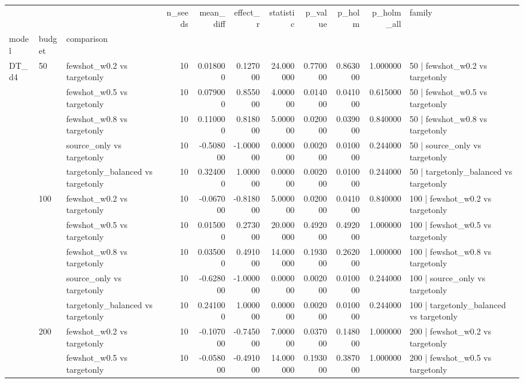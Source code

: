 \begin{tabular}{lllrrrrrrrl}
\toprule
 &  &  & n_seeds & mean_diff & effect_r & statistic & p_value & p_holm & p_holm_all & family \\
model & budget & comparison &  &  &  &  &  &  &  &  \\
\midrule
\multirow[t]{25}{*}{DT_d4} & \multirow[t]{5}{*}{50} & fewshot_w0.2 vs targetonly & 10 & 0.018000 & 0.127000 & 24.000000 & 0.770000 & 0.863000 & 1.000000 & 50 | fewshot_w0.2 vs targetonly \\
 &  & fewshot_w0.5 vs targetonly & 10 & 0.079000 & 0.855000 & 4.000000 & 0.014000 & 0.041000 & 0.615000 & 50 | fewshot_w0.5 vs targetonly \\
 &  & fewshot_w0.8 vs targetonly & 10 & 0.110000 & 0.818000 & 5.000000 & 0.020000 & 0.039000 & 0.840000 & 50 | fewshot_w0.8 vs targetonly \\
 &  & source_only vs targetonly & 10 & -0.508000 & -1.000000 & 0.000000 & 0.002000 & 0.010000 & 0.244000 & 50 | source_only vs targetonly \\
 &  & targetonly_balanced vs targetonly & 10 & 0.324000 & 1.000000 & 0.000000 & 0.002000 & 0.010000 & 0.244000 & 50 | targetonly_balanced vs targetonly \\
\cline{2-11}
 & \multirow[t]{5}{*}{100} & fewshot_w0.2 vs targetonly & 10 & -0.067000 & -0.818000 & 5.000000 & 0.020000 & 0.041000 & 0.840000 & 100 | fewshot_w0.2 vs targetonly \\
 &  & fewshot_w0.5 vs targetonly & 10 & 0.015000 & 0.273000 & 20.000000 & 0.492000 & 0.492000 & 1.000000 & 100 | fewshot_w0.5 vs targetonly \\
 &  & fewshot_w0.8 vs targetonly & 10 & 0.035000 & 0.491000 & 14.000000 & 0.193000 & 0.262000 & 1.000000 & 100 | fewshot_w0.8 vs targetonly \\
 &  & source_only vs targetonly & 10 & -0.628000 & -1.000000 & 0.000000 & 0.002000 & 0.010000 & 0.244000 & 100 | source_only vs targetonly \\
 &  & targetonly_balanced vs targetonly & 10 & 0.241000 & 1.000000 & 0.000000 & 0.002000 & 0.010000 & 0.244000 & 100 | targetonly_balanced vs targetonly \\
\cline{2-11}
 & \multirow[t]{5}{*}{200} & fewshot_w0.2 vs targetonly & 10 & -0.107000 & -0.745000 & 7.000000 & 0.037000 & 0.148000 & 1.000000 & 200 | fewshot_w0.2 vs targetonly \\
 &  & fewshot_w0.5 vs targetonly & 10 & -0.058000 & -0.491000 & 14.000000 & 0.193000 & 0.387000 & 1.000000 & 200 | fewshot_w0.5 vs targetonly \\

\end{tabular}
